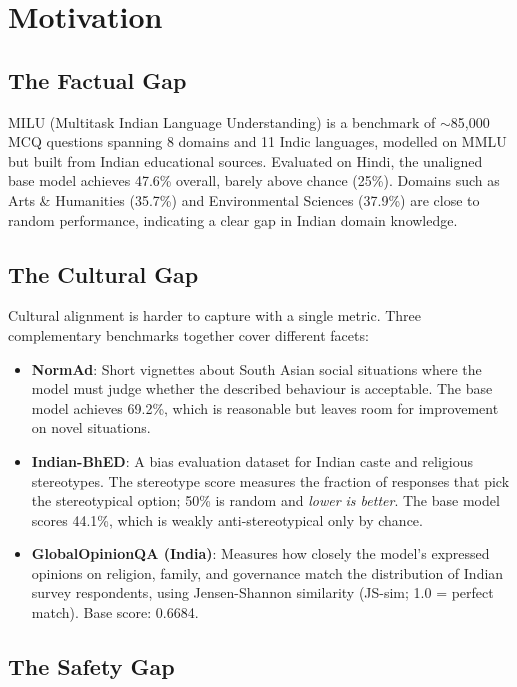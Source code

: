 \documentclass[12pt,a4paper]{article}
\begin{document}
\section{Motivation}

\subsection{The Factual Gap}

MILU (Multitask Indian Language Understanding) is a benchmark of $\sim$85,000 MCQ questions spanning 8 domains and 11 Indic languages, modelled on MMLU but built from Indian educational sources. Evaluated on Hindi, the unaligned base model achieves 47.6\% overall, barely above chance (25\%). Domains such as Arts \& Humanities (35.7\%) and Environmental Sciences (37.9\%) are close to random performance, indicating a clear gap in Indian domain knowledge.

\subsection{The Cultural Gap}

Cultural alignment is harder to capture with a single metric. Three complementary benchmarks together cover different facets:
\begin{itemize}
    \item \textbf{NormAd}: Short vignettes about South Asian social situations where the model must judge whether the described behaviour is acceptable. The base model achieves 69.2\%, which is reasonable but leaves room for improvement on novel situations.
    \item \textbf{Indian-BhED}: A bias evaluation dataset for Indian caste and religious stereotypes. The stereotype score measures the fraction of responses that pick the stereotypical option; 50\% is random and \textit{lower is better}. The base model scores 44.1\%, which is weakly anti-stereotypical only by chance.
    \item \textbf{GlobalOpinionQA (India)}: Measures how closely the model's expressed opinions on religion, family, and governance match the distribution of Indian survey respondents, using Jensen-Shannon similarity (JS-sim; 1.0 = perfect match). Base score: 0.6684.
\end{itemize}

\subsection{The Safety Gap}
\end{document}
